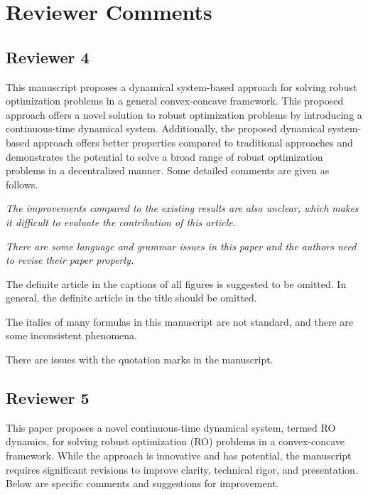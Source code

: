\documentclass[journal,twoside,web]{ieeecolor}
\begin{document}
\onecolumn

\iffalse  %
\section*{Reviewer Comments}

\subsection*{Reviewer 4}

This manuscript proposes a dynamical system-based approach for solving robust optimization problems in a general convex-concave framework. This proposed approach offers a novel solution to robust optimization problems by introducing a continuous-time dynamical system. Additionally, the proposed dynamical system-based approach offers better properties compared to traditional approaches and demonstrates the potential to solve a broad range of robust optimization problems in a decentralized manner. Some detailed comments are given as follows.

\textcolor{reviewerred}{\textit{The improvements compared to the existing results are also unclear, which makes it difficult to evaluate the contribution of this article.}}

\textcolor{reviewerred}{\textit{There are some language and grammar issues in this paper and the authors need to revise their paper properly.}}

The definite article in the captions of all figures is suggested to be omitted. In general, the definite article in the title should be omitted.

The italics of many formulas in this manuscript are not standard, and there are some inconsistent phenomena.

There are issues with the quotation marks in the manuscript.

\subsection*{Reviewer 5}

This paper proposes a novel continuous-time dynamical system, termed RO dynamics, for solving robust optimization (RO) problems in a convex-concave framework. While the approach is innovative and has potential, the manuscript requires significant revisions to improve clarity, technical rigor, and presentation. Below are specific comments and suggestions for improvement.
\end{document}
